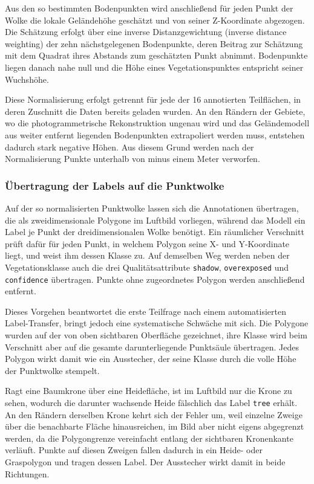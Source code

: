 Aus den so bestimmten Bodenpunkten wird anschließend für jeden Punkt der Wolke die lokale Geländehöhe geschätzt und von seiner Z-Koordinate abgezogen. Die Schätzung erfolgt über eine inverse Distanzgewichtung (inverse distance weighting) der zehn nächstgelegenen Bodenpunkte, deren Beitrag zur Schätzung mit dem Quadrat ihres Abstands zum geschätzten Punkt abnimmt. Bodenpunkte liegen danach nahe null und die Höhe eines Vegetationspunktes entspricht seiner Wuchshöhe.

Diese Normalisierung erfolgt getrennt für jede der 16 annotierten Teilflächen, in deren Zuschnitt die Daten bereits geladen wurden. An den Rändern der Gebiete, wo die photogrammetrische Rekonstruktion ungenau wird und das Geländemodell aus weiter entfernt liegenden Bodenpunkten extrapoliert werden muss, entstehen dadurch stark negative Höhen. Aus diesem Grund werden nach der Normalisierung Punkte unterhalb von minus einem Meter verworfen.

\subsubsection{Übertragung der Labels auf die Punktwolke}\label{label_transfer}

Auf der so normalisierten Punktwolke lassen sich die Annotationen übertragen, die als zweidimensionale Polygone im Luftbild vorliegen, während das Modell ein Label je Punkt der dreidimensionalen Wolke benötigt. Ein räumlicher Verschnitt prüft dafür für jeden Punkt, in welchem Polygon seine X- und Y-Koordinate liegt, und weist ihm dessen Klasse zu. Auf demselben Weg werden neben der Vegetationsklasse auch die drei Qualitätsattribute \texttt{shadow}, \texttt{overexposed} und \texttt{confidence} übertragen. Punkte ohne zugeordnetes Polygon werden anschließend entfernt.

Dieses Vorgehen beantwortet die erste Teilfrage nach einem automatisierten Label-Transfer, bringt jedoch eine systematische Schwäche mit sich. Die
Polygone wurden auf der von oben sichtbaren Oberfläche gezeichnet, ihre Klasse
wird beim Verschnitt aber auf die gesamte darunterliegende Punktsäule
übertragen. Jedes Polygon wirkt damit wie ein Ausstecher, der seine Klasse
durch die volle Höhe der Punktwolke stempelt.

Ragt eine Baumkrone über eine Heidefläche, ist im Luftbild nur die Krone zu sehen, wodurch die darunter wachsende Heide fälschlich das Label \texttt{tree} erhält. An den Rändern derselben Krone kehrt sich der Fehler um, weil einzelne Zweige über die benachbarte Fläche hinausreichen, im Bild aber nicht eigens abgegrenzt werden, da die Polygongrenze vereinfacht entlang der sichtbaren Kronenkante verläuft. Punkte auf diesen Zweigen fallen dadurch in ein Heide- oder Graspolygon und tragen dessen Label. Der Ausstecher wirkt damit in beide Richtungen.

